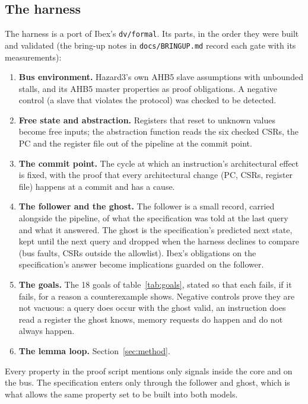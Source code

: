 \documentclass[11pt]{article}
\newcommand{\code}[1]{\texttt{#1}}
\begin{document}
\subsection{The harness}

The harness is a port of Ibex's \code{dv/formal}. Its parts, in the order they
were built and validated (the bring-up notes in \code{docs/BRINGUP.md} record
each gate with its measurements):

\begin{enumerate}
\item \textbf{Bus environment.} Hazard3's own AHB5 slave assumptions with
  unbounded stalls, and its AHB5 master properties as proof obligations. A
  negative control (a slave that violates the protocol) was checked to be
  detected.
\item \textbf{Free state and abstraction.} Registers that reset to unknown
  values become free inputs; the abstraction function reads the six checked
  CSRs, the PC and the register file out of the pipeline at the commit point.
\item \textbf{The commit point.} The cycle at which an instruction's
  architectural effect is fixed, with the proof that every architectural change
  (PC, CSRs, register file) happens at a commit and has a cause.
\item \textbf{The follower and the ghost.} The follower is a small record,
  carried alongside the pipeline, of what the specification was told at the
  last query and what it answered. The ghost is the specification's predicted
  next state, kept until the next query and dropped when the harness declines
  to compare (bus faults, CSRs outside the allowlist). Ibex's obligations on
  the specification's answer become implications guarded on the follower.
\item \textbf{The goals.} The 18 goals of table~\ref{tab:goals}, stated so
  that each fails, if it fails, for a reason a counterexample shows. Negative
  controls prove they are not vacuous: a query does occur with the ghost valid,
  an instruction does read a register the ghost knows, memory requests do
  happen and do not always happen.
\item \textbf{The lemma loop.} Section~\ref{sec:method}.
\end{enumerate}

Every property in the proof script mentions only signals inside the core and on
the bus. The specification enters only through the follower and ghost, which is
what allows the same property set to be built into both models.
\end{document}
